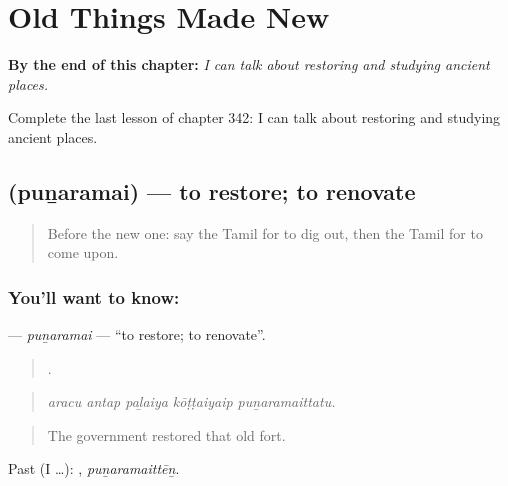 
\chapter{Old Things Made New}
\label{ch:ta-old-things-made-new}

\begin{chapteropening}
\textbf{By the end of this chapter:} \emph{I can talk about restoring and studying ancient places.}

Complete the last lesson of chapter 342: I can talk about restoring and studying ancient places.
\end{chapteropening}

\section[\texorpdfstring{\ta{புனரமை} (puṉaramai)}{புனரமை (puṉaramai)}]{ (puṉaramai) — to restore; to renovate}

\label{lesson:TA-C342-punaramai}



\begin{quote}
Before the new one: say the Tamil for to dig out, then the Tamil for to come upon.
\end{quote}

\subsection*{You'll want to know: }
\textbf{} — \emph{puṉaramai} — \textquotedblleft{}to restore; to renovate\textquotedblright{}.

\begin{quote}
    .
\end{quote}

\begin{quote}
\emph{aracu antap paḻaiya kōṭṭaiyaip puṉaramaittatu.}
\end{quote}

\begin{quote}
The government restored that old fort.
\end{quote}

Past (I …): , \emph{puṉaramaittēṉ}.

